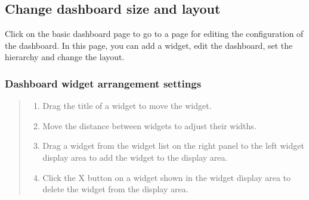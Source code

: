 \documentclass[letterpaper,10pt,english]{sphinxmanual}
\begin{document}
\subsection{Change dashboard size and layout}
\label{\detokenize{discovery/part04/change_dashboard_layout_and_size:id1}}\label{\detokenize{discovery/part04/change_dashboard_layout_and_size::doc}}
Click  on the basic dashboard page to go to a page for editing the configuration of the dashboard. In this page, you can add a widget, edit the dashboard, set the hierarchy and change the layout.


\subsubsection{Dashboard widget arrangement settings}
\label{\detokenize{discovery/part04/change_dashboard_layout_and_size:id2}}\begin{quote}

\begin{figure}[H]
\centering

\noindent{}
\end{figure}
\begin{enumerate}
\def\theenumi{\arabic{enumi}}
\def\labelenumi{\theenumi .}
\makeatletter\def\p@enumii{\p@enumi \theenumi .}\makeatother
\item {} 
 Drag the title of a widget to move the widget.

\item {} 
 Move the distance between widgets to adjust their widths.

\item {} 
 Drag a widget from the widget list on the right panel to the left widget display area to add the widget to the display area.

\item {} 
 Click the X button on a widget shown in the widget display area to delete the widget from the display area.

\end{enumerate}
\end{quote}
\end{document}
